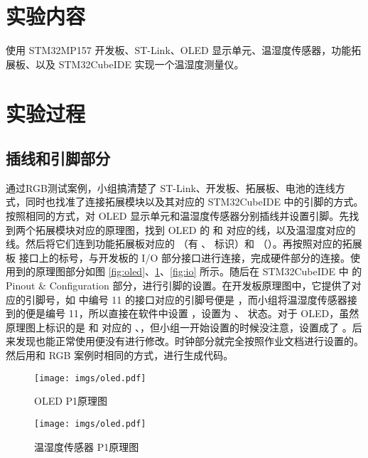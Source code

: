 \section{实验内容}

使用 STM32MP157 开发板、ST-Link、OLED 显示单元、温湿度传感器，功能拓展板、以及 STM32CubeIDE 实现一个温湿度测量仪。

\section{实验过程}

\subsection{插线和引脚部分}

通过RGB测试案例，小组搞清楚了 ST-Link、开发板、拓展板、电池的连线方式，同时也找准了连接拓展模块以及其对应的 STM32CubeIDE 中的引脚的方式。按照相同的方式，对 OLED 显示单元和温湿度传感器分别插线并设置引脚。先找到两个拓展模块对应的原理图，找到 OLED 的  和  对应的线，以及温湿度对应的  线。然后将它们连到功能拓展板对应的  （有 、 标识）和  （）。再按照对应的拓展板  接口上的标号，与开发板的 I/O 部分接口进行连接，完成硬件部分的连接。使用到的原理图部分如图 \ref{fig:oled}、\ref{fig:hdt11}、\ref{fig:io} 所示。随后在 STM32CubeIDE 中 的 Pinout \& Configuration 部分，进行引脚的设置。在开发板原理图中，它提供了对应的引脚号，如  中编号 11 的接口对应的引脚号便是 ，而小组将温湿度传感器接到的便是编号 11，所以直接在软件中设置 ，设置为 、 状态。对于 OLED，虽然原理图上标识的是  和  对应的 、，但小组一开始设置的时候没注意，设置成了 。后来发现也能正常使用便没有进行修改。时钟部分就完全按照作业文档进行设置的。然后用和 RGB 案例时相同的方式，进行生成代码。

\begin{figure}[h!]
    \centering
    \begin{minipage}{0.45\textwidth}
        \centering
        \texttt{[image: imgs/oled.pdf]}
        \caption{OLED P1原理图}
        \label{fig:oled}
    \end{minipage}
    \begin{minipage}{0.45\textwidth}
        \centering
        \texttt{[image: imgs/oled.pdf]}
        \caption{温湿度传感器 P1原理图}
        \label{fig:hdt11}
    \end{minipage}
\end{figure}

